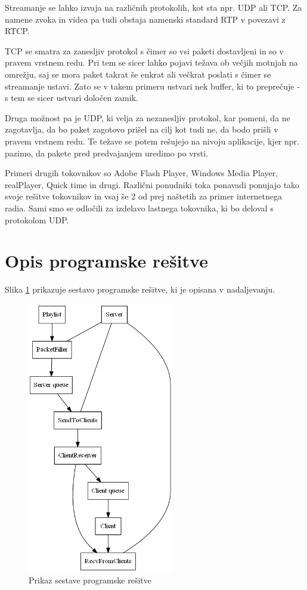 \documentclass[journal]{IEEEtran}
\begin{document}
Streamanje se lahko izvaja na različnih protokolih, kot sta npr. UDP ali TCP. Za namene zvoka in videa pa tudi obstaja namenski standard RTP v povezavi z RTCP.

TCP se smatra za zanesljiv protokol s čimer so vsi paketi dostavljeni in so v pravem vrstnem redu. Pri tem se sicer lahko pojavi težava ob večjih motnjah na omrežju, saj se mora paket takrat še enkrat ali večkrat poslati s čimer se streamanje ustavi. Zato se v takem primeru ustvari nek buffer, ki to preprečuje - s tem se sicer ustvari določen zamik.

Druga možnost pa je UDP, ki velja za nezanesljiv protokol, kar pomeni, da ne zagotavlja, da bo paket zagotovo prišel na cilj kot tudi ne, da bodo prišli v pravem vrstnem redu. Te težave se potem rešujejo na nivoju aplikacije, kjer npr. pazimo, da pakete pred predvajanjem uredimo po vrsti.

Primeri drugih tokovnikov so Adobe Flash Player, Windows Media Player, realPlayer, Quick time in drugi. Različni ponudniki toka ponavadi ponujajo tako svoje rešitve tokovnikov in vsaj še 2 od prej naštetih za primer internetnega radia. Sami smo se odločili za izdelavo lastnega tokovnika, ki bo deloval s protokolom UDP.

 

\section{Opis programske rešitve}

Slika \ref{sestava} prikazuje sestavo programske rešitve, ki je opisana v nadaljevanju.

\begin{figure}[!t]
\centering
\includegraphics[width=2.5in]{sestava.png}
\caption{Prikaz sestave programske rešitve}
\label{sestava}
\end{figure}
\end{document}
